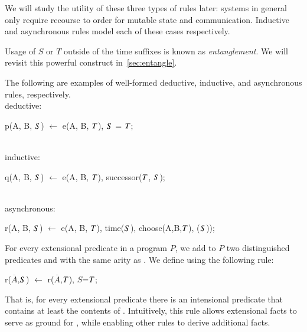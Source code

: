 We will study the utility of these three types of rules later: systems in
general only require recourse to order for mutable state and communication.
Inductive and asynchronous rules model each of these cases respectively.

Usage of $S$ or $T$ outside of the time suffixes is known as {\em
entanglement}.  We will revisit this powerful construct in~\ref{sec:entangle}. 

\begin{example}
The following are examples of well-formed deductive, inductive, and asynchronous rules, respectively.
\\
deductive:
\begin{Dedalus}
p(A, B, \(\DS\)) \(\leftarrow\) e(A, B, \(\DT\)), \(\DS\) = \(\DT\);
\end{Dedalus}
\\
inductive:
\begin{Dedalus}
q(A, B, \(\DS\)) \(\leftarrow\) e(A, B, \(\DT\)), successor(\(\DT\), \(\DS\));
\end{Dedalus}
\\
asynchronous:
\begin{Dedalus}
r(A, B, \(\DS\)) \(\leftarrow\) e(A, B, \(\DT\)), time(\(\DS\)),
   choose(A,B,\(\DT\)), (\(\DS\)));
\end{Dedalus}
\end{example}

For every extensional predicate  in a \lang program $P$, we add to
$P$ two distinguished predicates  and  with the same arity
as .  We define  using the following rule:

\begin{dedalus}
r\pos($\overline{A}$,\(\DS\)) \(\leftarrow\) r($\overline{A}$,\(\DT\)), \(S\)=\(\DT\);
\end{dedalus}

   

\noindent{}That is, for every extensional predicate  there is an intensional
predicate  that contains at least the contents of .
Intuitively, this rule allows extensional facts to serve as ground for
, while enabling other rules to derive additional  facts.

